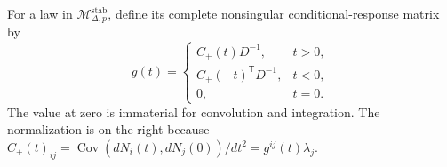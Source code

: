 For a law in \(\mathcal M_{\Delta,p}^{\mathrm{stab}}\), define its complete nonsingular conditional-response matrix by
\[
 g(t)=
 \begin{cases}
 C_{+}(t)D^{-1},&t>0,\\
 C_{+}(-t)^{\mathsf T}D^{-1},&t<0,\\
 0,&t=0.
 \end{cases}
\]
The value at zero is immaterial for convolution and integration.  The normalization is on the right because \(C_{+}(t)_{ij}=\operatorname{Cov}(dN_i(t),dN_j(0))/dt^2=g^{ij}(t)\lambda_j\).
